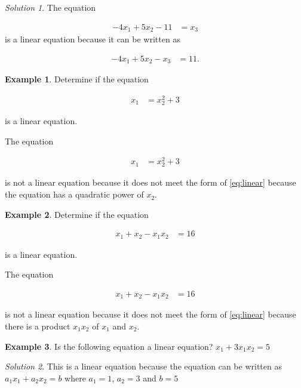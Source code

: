 \documentclass[
]{book}
\theoremstyle{definition}
\theoremstyle{definition}
\newtheorem{example}{Example}[chapter]
\theoremstyle{definition}
\theoremstyle{definition}
\theoremstyle{remark}
\newtheorem*{solution}{Solution}
\begin{document}
\begin{solution}
The equation

\[
\begin{aligned}
-4 x_1 + 5 x_2 - 11 & = x_3
\end{aligned}
\]
is a linear equation because it can be written as

\[
\begin{aligned}
-4 x_1 + 5 x_2 - x_3 & = 11.
\end{aligned}
\]
\end{solution}

\begin{example}
Determine if the equation

\[
\begin{aligned}
x_1 & = x_2^2 + 3
\end{aligned}
\]

is a linear equation.
\end{example}

The equation

\[
\begin{aligned}
x_1 & = x_2^2 + 3
\end{aligned}
\]

is not a linear equation because it does not meet the form of \eqref{eq:linear} because the equation has a quadratic power of \(x_2\).

\begin{example}
Determine if the equation

\[
\begin{aligned}
x_1 + x_2 - x_1 x_2 & = 16
\end{aligned}
\]

is a linear equation.
\end{example}

The equation

\[
\begin{aligned}
x_1 + x_2 - x_1 x_2 & = 16
\end{aligned}
\]

is not a linear equation because it does not meet the form of \eqref{eq:linear} because there is a product \(x_1x_2\) of \(x_1\) and \(x_2\).

\begin{example}
Is the following equation a linear equation?
\(x_1 + 3 x_1 x_2 = 5\)
\end{example}

\begin{solution}
This is a linear equation because the equation can be written as \(a_1 x_1 + a_2 x_2 = b\) where \(a_1 = 1\), \(a_2 = 3\) and \(b = 5\)
\end{solution}
\end{document}
